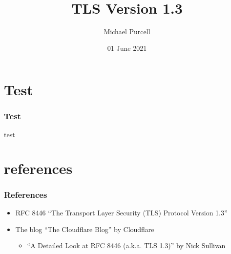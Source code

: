\documentclass[aspectratio=169]{beamer}
\title{TLS Version 1.3}
\author{Michael Purcell}
\date{01 June 2021}
\begin{document}
\begin{frame}[Triangle=siiorange]
	\titlepage
\end{frame}

\section{Test}
\begin{frame}[Triangle=siiorange]
	\tocpage
\end{frame}

\begin{frame}
	\frametitle{Test}
	test
\end{frame}

\section{references}
\begin{frame}[Triangle=siiorange]
	\tocpage
\end{frame}

\begin{frame}
	\frametitle{References}
	\begin{itemize}
		\item RFC 8446 ``The Transport Layer Security (TLS) Protocol Version 1.3''
		
		\vfill
		
		\item The blog ``The Cloudflare Blog'' by Cloudflare
		\begin{itemize}
			\item ``A Detailed Look at RFC 8446 (a.k.a. TLS 1.3)'' by Nick Sullivan
		\end{itemize}
	\end{itemize}
\end{frame}
\end{document}
